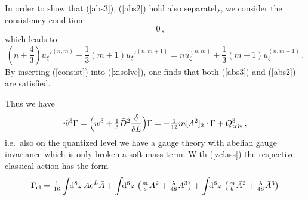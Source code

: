 \documentclass[a4paper,12pt]{article}
\newcommand{\e}{{\rm e}}
\newcommand{\dS}{\!\!{\rm d}^6z\,}
\newcommand{\dSb}{\!\!{\rm d}^6\bar z\,}
\newcommand{\dV}{\!\!{\rm d}^8z\,}
\newcommand{\Gcl}{\Gamma_{\rm cl}}
\newcommand{\uxi}{u_{\xi}}
\newcommand{\uxib}{{u_{\xi}'}}
\newcommand{\tfr}[2]{{\textstyle \frac{#1}{#2}}}
\newcommand{\fdq}[2]{\frac{\delta #1}{\delta #2}}
\begin{document}
In order to show that  (\ref{abs3}), (\ref{abs2}) hold also separately,
we consider the consistency condition 
\begin{equation}
[\tilde w^3(z), \bar{\tilde w}^3(z')]=0 \,,
\end{equation}
which leads to
\begin{equation}
(n+\tfr{4}{3}) \uxib^{(n,m)} +\tfr{1}{3} (m+1) \uxib^{(n,m+1)} = n
\uxi^{(n,m)} +\tfr{1}{3} (m+1) \uxi^{(n,m+1)} \,.
 \label{consist}
\end{equation}
By inserting (\ref{consist}) into (\ref{xisolve}), one finds that both
(\ref{abs3}) and (\ref{abs2}) are satisfied.

Thus we have
\begin{equation}
\tilde w^3 \Gamma = \Bigl( w^3 +\tfr{1}{3} \bar D^2 \fdq{}{L} \Bigr) \Gamma
=-\tfr{1}{12} m [A^2]_2\cdot
\Gamma + Q^3_{\rm triv}\,, \label{gaugeinv} 
\end{equation}
i.e.\ also on the quantized level we have a gauge theory with abelian gauge
invariance which is only broken a soft mass term.
With (\ref{zclass}) the respective classical action has
the form
\begin{equation}
\Gcl = \tfr{1}{16} \int \dV A \e^{L} \bar A 
+ \int \dS \left(\tfr{m}{8} A^2 +
  \tfr{\lambda}{48} A^3 \right) 
 + \int \dSb \left(\tfr{m}{8} \bar A^2 +   \tfr{\lambda}{48} \bar A^3 \right)
\end{equation}
\end{document}
